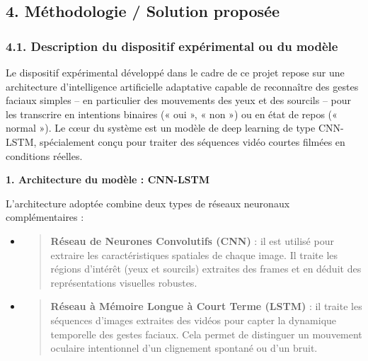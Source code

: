 \documentclass[
]{article}
\begin{document}
\hypertarget{section-32}{%
\subsection{}\label{section-32}}

\hypertarget{muxe9thodologie-solution-proposuxe9e}{%
\subsection{4. Méthodologie / Solution proposée}\label{muxe9thodologie-solution-proposuxe9e}}

\hypertarget{description-du-dispositif-expuxe9rimental-ou-du-moduxe8le}{%
\subsubsection{4.1. Description du dispositif expérimental ou du modèle}\label{description-du-dispositif-expuxe9rimental-ou-du-moduxe8le}}

Le dispositif expérimental développé dans le cadre de ce projet repose sur une architecture d'intelligence artificielle adaptative capable de reconnaître des gestes faciaux simples -- en particulier des mouvements des yeux et des sourcils -- pour les transcrire en intentions binaires (« oui », « non ») ou en état de repos (« normal »). Le cœur du système est un modèle de deep learning de type CNN-LSTM, spécialement conçu pour traiter des séquences vidéo courtes filmées en conditions réelles.

\textbf{1. Architecture du modèle : CNN-LSTM}

L'architecture adoptée combine deux types de réseaux neuronaux complémentaires :

\begin{itemize}
\item
  \begin{quote}
  \textbf{Réseau de Neurones Convolutifs (CNN)} : il est utilisé pour extraire les caractéristiques spatiales de chaque image. Il traite les régions d'intérêt (yeux et sourcils) extraites des frames et en déduit des représentations visuelles robustes.
  \end{quote}
\item
  \begin{quote}
  \textbf{Réseau à Mémoire Longue à Court Terme (LSTM)} : il traite les séquences d'images extraites des vidéos pour capter la dynamique temporelle des gestes faciaux. Cela permet de distinguer un mouvement oculaire intentionnel d'un clignement spontané ou d'un bruit.
  \end{quote}
\end{itemize}
\end{document}
